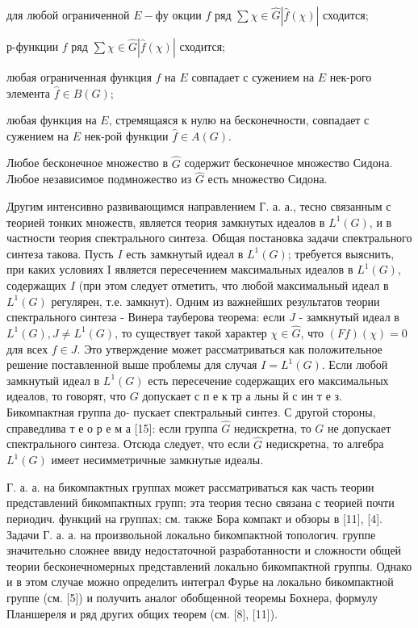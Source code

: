 \documentclass[10pt]{article}
\begin{document}
для любой ограниченной $E-ф у$ окции $f$ ряд $\sum \chi \in \widehat{G}|\hat{f}(\chi)|$ сходится;



р-функции $f$ ряд $\sum \chi \in \hat{G}|\hat{f}(\chi)|$ сходится;



любая ограниченная функция $f$ на $E$ совпадает с сужением на $E$ нек-рого элемента $\hat{f} \in B(G)$;



любая функция на $E$, стремящаяся к нулю на бесконечности, совпадает с сужением на $E$ нек-рой функции $\hat{f} \in A(G)$.



Любое бесконечное множество в $\hat{G}$ содержит бесконечное множество Сидона. Любое независимое подмножество из $\hat{G}$ есть множество Сидона.



Другим интенсивно развивающимся направлением Г. а. а., тесно связанным с теорией тонких множеств, является теория замкнутых идеалов в $L^{1}(G)$, и в частности теория спектрального синтеза. Общая постановка задачи спектрального синтеза такова. Пусть $I$ есть замкнутый идеал в $L^{1}(G)$; требуется выяснить, при каких условиях I является пересечением максимальных идеалов в $L^{1}(G)$, содержащих $I$ (при этом следует отметить, что любой максимальный идеал в $L^{1}(G)$ регулярен, т.е. замкнут). Одним из важнейших результатов теории спектрального синтеза - Винера тауберова теорема: если $J$ - замкнутый идеал в $L^{1}(G), J \neq L^{1}(G)$, то существует такой характер $\chi \in \widehat{G}$, что $(F f)(\chi)=0$ для всех $f \in J$. Это утверждение может рассматриваться как положительное решение поставленной выше проблемы для случая $I=L^{1}(G)$. Если любой замкнутый идеал в $L^{1}(G)$ есть пересечение содержащих его максимальных идеалов, то говорят, что $G$ допускает с п е к тр а льны й с ин т е з. Бикомпактная группа до- пускает спектральный синтез. С другой стороны, справедлива т е о р е м а [15]: если группа $\hat{G}$ недискретна, то $G$ не допускает спектрального синтеза. Отсюда следует, что если $\widehat{G}$ недискретна, то алгебра $L^{1}(G)$ имеет несимметричные замкнутые идеалы.



Г. а. а. на бикомпактных группах может рассматриваться как часть теории представлений бикомпактных групп; эта теория тесно связана с теорией почти периодич. функций на группах; см. также Бора компакт и обзоры в [11], [4]. Задачи Г. а. а. на произвольной локально бикомпактной топологич. группе значительно сложнее ввиду недостаточной разработанности и сложности общей теории бесконечномерных представлений локально бикомпактной группы. Однако и в этом случае можно определить интеграл Фурье на локально бикомпактной группе (см. [5]) и получить аналог обобщенной теоремы Бохнера, формулу Планшереля и ряд других общих теорем (см. [8], [11]).
\end{document}
